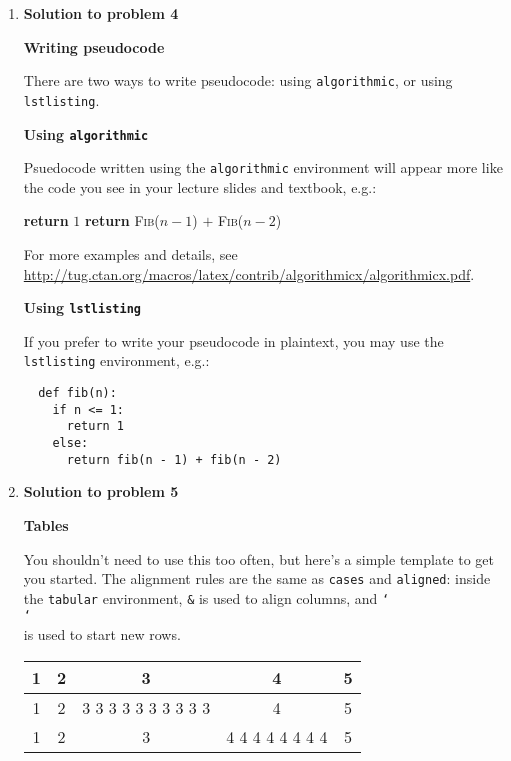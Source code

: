 \documentclass[11pt]{article}
\newcommand{\problemitem}[1]{
  \bigskip
  \item {\bf Solution to problem #1}
  \medskip
}
\newcommand{\BACKSLASH}{\char`\\ }
\begin{document}
\begin{enumerate}
\newpage

\problemitem{4}

{\large \textbf{Writing pseudocode}}

There are two ways to write pseudocode: using \texttt{algorithmic}, or using
\texttt{lstlisting}.

\medskip
\textbf{Using \texttt{algorithmic}}

Psuedocode written using the \texttt{algorithmic} environment will appear more
like the code you see in your lecture slides and textbook, e.g.:

\begin{algorithmic}
      \State \textbf{return} $1$
    \Else
      \State \textbf{return} \textsc{Fib}($n - 1$) $+$ \textsc{Fib}($n - 2$)
    \EndIf
  \EndFunction
\end{algorithmic}

For more examples and details, see
\url{http://tug.ctan.org/macros/latex/contrib/algorithmicx/algorithmicx.pdf}.

\medskip
\textbf{Using \texttt{lstlisting}}

If you prefer to write your pseudocode in plaintext, you may use the
\texttt{lstlisting} environment, e.g.:

\begin{lstlisting}
  def fib(n):
    if n <= 1:
      return 1
    else:
      return fib(n - 1) + fib(n - 2)
\end{lstlisting}


\problemitem{5}

{\large \textbf{Tables}}

You shouldn't need to use this too often, but here's a simple template to get
you started. The alignment rules are the same as \texttt{cases} and
\texttt{aligned}: inside the \texttt{tabular} environment, \texttt{\&} is used
to align columns, and \texttt{\BACKSLASH \BACKSLASH} is used to start new rows.

\begin{table}[tbh]
  \centering
  \renewcommand\arraystretch{1.5}
  \begin{tabular}{|c|c|c|c|c|}\hline
    1 & 2 & 3 & 4 & 5\\ \hline %
  1   & 2 &  3 3 3 3 3 3 3 3 3 3     &4&5 \\ \hline %
  1
      & 2 &3
& 4 4 4 4 4 4 4 4 & 5
\\
\hline %

  \end{tabular}
\end{table}

\end{enumerate}
\end{document}
